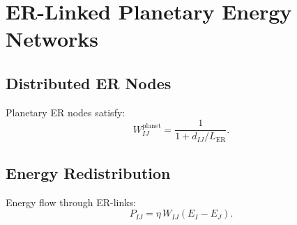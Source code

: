 \chapter{ER-Linked Planetary Energy Networks}

\section{Distributed ER Nodes}
Planetary ER nodes satisfy:
\[
W_{IJ}^{\text{planet}} = \frac{1}{1 + d_{IJ}/L_{\mathrm{ER}}}.
\]

\section{Energy Redistribution}
Energy flow through ER-links:
\[
P_{IJ} = \eta\, W_{IJ}(E_I - E_J).
\]

